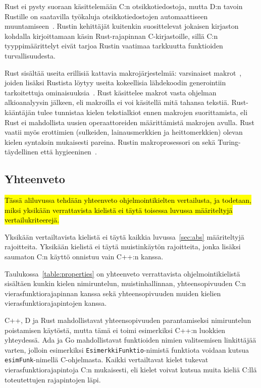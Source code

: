Rust ei pysty suoraan käsittelemään C:n otsikkotiedostoja, mutta D:n tavoin
Rustille on saatavilla työkaluja otsikkotiedostojen automaattiseen
muuntamiseen~\citep{rustbindgen}. Rustin kehittäjät kuitenkin suosittelevat
jokaisen kirjaston kohdalla kirjoittamaan käsin Rust-rajapinnan C-kirjastoille,
sillä C:n tyyppimäärittelyt eivät tarjoa Rustin vaatimaa tarkkuutta funktioiden
turvallisuudesta.

Rust sisältää useita erillisiä kattavia makrojärjestelmiä:
varsinaiset makrot~\citep{rustmacros}, joiden lisäksi Rustista löytyy useita
kokeellisia lähdekoodin generointiin tarkoitettuja
ominaisuuksia~\citep{rustprocmacros, rustplugins}. Rust käsittelee makrot vasta
ohjelman alkioanalyysin jälkeen, eli makroilla ei voi käsitellä mitä tahansa
tekstiä. Rust-kääntäjän tulee tunnistaa kielen tekstialkiot ennen makrojen
suorittamista, eli Rust ei mahdollista uusien operaattoreiden määrittämistä
makrojen avulla. Rust vaatii myös erottimien (sulkeiden, lainausmerkkien ja
heittomerkkien) olevan kielen syntaksin mukaisesti pareina. Rustin
makroprosessori on sekä Turing-täydellinen että hygieeninen~\citep{rustmacros}.

\subsection{Yhteenveto}

\hl{Tässä aliluvussa tehdään yhteenveto ohjelmointikielten vertailusta, ja
todetaan, miksi yksikään verrattavista kielistä ei täytä toisessa luvussa
määriteltyjä vertailukriteerejä.}

Yksikään vertailtavista kielistä ei täytä kaikkia luvussa~\ref{sec:abs}
määriteltyjä rajoitteita. Yksikään kielistä ei täytä muistinkäytön rajoitteita,
jonka lisäksi saumaton C:n käyttö onnistuu vain C++:n kanssa.

Taulukossa~\ref{table:properties} on yhteenveto verrattavista
ohjelmointikielistä sisältäen kunkin kielen nimiruntelun, muistinhallinnan,
yhteensopivuuden C:n vierasfunktiorajapinnan kanssa sekä yhteensopivuuden
muiden kielien vierasfunktiorajapintojen kanssa.

C++, D ja Rust mahdollistavat yhteensopivuuden parantamiseksi nimiruntelun
poistamisen käytöstä, mutta tämä ei toimi esimerkiksi C++:n luokkien
yhteydessä. Ada ja Go mahdollistavat funktioiden nimien valitsemisen
linkittäjää varten, jolloin esimerkiksi \texttt{EsimerkkiFunktio}-nimistä
funktiota voidaan kutsua \texttt{esimFunk}-nimellä C-ohjelmasta. Kaikki
vertailtavat kielet tukevat vierasfunktiorajapintoja C:n mukaisesti, eli kielet
voivat kutsua muita kieliä C:llä toteutettujen rajapintojen läpi.

